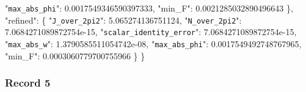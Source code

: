 \documentclass[
  10pt,
]{article}
\newenvironment{Shaded}{}{}
\newcommand{\DataTypeTok}[1]{\textcolor[rgb]{0.56,0.13,0.00}{#1}}
\newcommand{\FloatTok}[1]{\textcolor[rgb]{0.25,0.63,0.44}{#1}}
\newcommand{\FunctionTok}[1]{\textcolor[rgb]{0.02,0.16,0.49}{#1}}
\begin{document}
\begin{Shaded}
\begin{Highlighting}[]
    \DataTypeTok{"\nolinkurl{max_abs_phi}"}\FunctionTok{:} \FloatTok{0.0017549346590397333}\FunctionTok{,}
    \DataTypeTok{"min\_F"}\FunctionTok{:} \FloatTok{0.0021285032890496643}
  \FunctionTok{\},}
  \DataTypeTok{"refined"}\FunctionTok{:} \FunctionTok{\{}
    \DataTypeTok{"\nolinkurl{J_over_2pi2}"}\FunctionTok{:} \FloatTok{5.065274136751124}\FunctionTok{,}
    \DataTypeTok{"\nolinkurl{N_over_2pi2}"}\FunctionTok{:} \FloatTok{7.0684271089872754e{-}15}\FunctionTok{,}
    \DataTypeTok{"\nolinkurl{scalar_identity_error}"}\FunctionTok{:} \FloatTok{7.0684271089872754e{-}15}\FunctionTok{,}
    \DataTypeTok{"\nolinkurl{max_abs_w}"}\FunctionTok{:} \FloatTok{1.3790585511054742e{-}08}\FunctionTok{,}
    \DataTypeTok{"\nolinkurl{max_abs_phi}"}\FunctionTok{:} \FloatTok{0.0017549492748767965}\FunctionTok{,}
    \DataTypeTok{"min\_F"}\FunctionTok{:} \FloatTok{0.0003060779700755966}
  \FunctionTok{\}}
\FunctionTok{\}}
\end{Highlighting}
\end{Shaded}

\hypertarget{record-5-2}{%
\subsubsection{Record 5}\label{record-5-2}}
\end{document}

